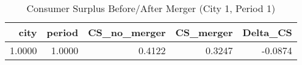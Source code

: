 \begin{table}[htbp]
    \centering
    \caption{Consumer Surplus Before/After Merger (City 1, Period 1)}
    \label{tab:q12_welfare_city1_period1}
\begin{tabular}{rrrrr}
\toprule
city & period & CS\_no\_merger & CS\_merger & Delta\_CS \\
\midrule
\midrule
1.0000 & 1.0000 & 0.4122 & 0.3247 & -0.0874 \\
\bottomrule
\bottomrule
\end{tabular}

\end{table}
